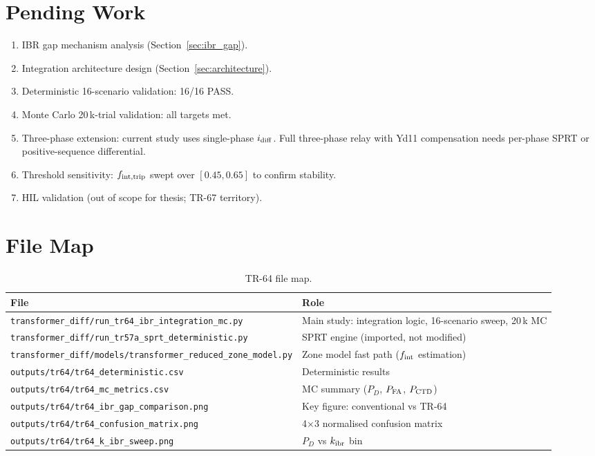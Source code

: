 \documentclass[11pt, a4paper]{article}
\newcommand{\fint}{f_{\rm int}}
\begin{document}
\section{Pending Work}
\label{sec:pending}

\begin{enumerate}
  \item[$\checkmark$] IBR gap mechanism analysis (Section~\ref{sec:ibr_gap}).
  \item[$\checkmark$] Integration architecture design (Section~\ref{sec:architecture}).
  \item[$\checkmark$] Deterministic 16-scenario validation: 16/16 PASS.
  \item[$\checkmark$] Monte Carlo 20\,k-trial validation: all targets met.
  \item[$\square$] Three-phase extension: current study uses single-phase
    $i_{\rm diff}$.  Full three-phase relay with Yd11 compensation needs
    per-phase SPRT or positive-sequence differential.
  \item[$\square$] Threshold sensitivity: $f_{{\rm int},{\rm trip}}$ swept over
    $[0.45, 0.65]$ to confirm stability.
  \item[$\square$] HIL validation (out of scope for thesis; TR-67 territory).
\end{enumerate}


\section{File Map}
\label{sec:filemap}

\begin{table}[h]
\centering
\caption{TR-64 file map.}
\label{tab:filemap64}
\begin{tabular}{p{}p{}}
\toprule
File & Role \\
\midrule
\texttt{transformer\_diff/run\_tr64\_ibr\_integration\_mc.py}
  & Main study: integration logic, 16-scenario sweep, 20\,k MC \\
\texttt{transformer\_diff/run\_tr57a\_sprt\_deterministic.py}
  & SPRT engine (imported, not modified) \\
\texttt{transformer\_diff/models/transformer\_reduced\_zone\_model.py}
  & Zone model fast path ($\fint$ estimation) \\
\texttt{outputs/tr64/tr64\_deterministic.csv}
  & Deterministic results \\
\texttt{outputs/tr64/tr64\_mc\_metrics.csv}
  & MC summary ($P_D$, $P_{\rm FA}$, $P_{\rm CTD}$) \\
\texttt{outputs/tr64/tr64\_ibr\_gap\_comparison.png}
  & Key figure: conventional vs TR-64 \\
\texttt{outputs/tr64/tr64\_confusion\_matrix.png}
  & 4$\times$3 normalised confusion matrix \\
\texttt{outputs/tr64/tr64\_k\_ibr\_sweep.png}
  & $P_D$ vs $k_{\rm ibr}$ bin \\
\bottomrule
\end{tabular}
\end{table}




\end{document}
